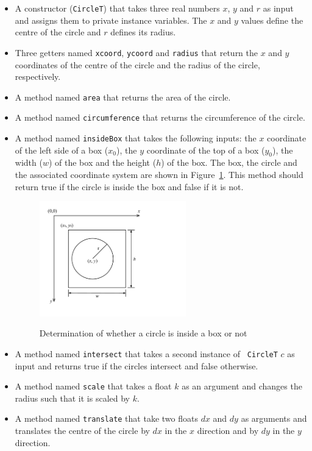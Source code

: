 \documentclass[12pt]{article}
\begin{document}
\begin{itemize}
\item A constructor ({\tt CircleT}) that takes three real numbers $x$, $y$
  and $r$ as input and assigns them to private instance variables.  The $x$ and
  $y$ values define the centre of the circle and $r$ defines its radius.

\item Three getters named {\tt xcoord}, {\tt ycoord} and {\tt radius} that
  return the $x$ and $y$ coordinates of the centre of the circle and the radius
  of the circle, respectively.

\item A method named {\tt area} that returns the area of the circle.

\item A method named {\tt circumference} that returns the circumference of the circle.

\item A method named {\tt insideBox} that takes the following inputs: 
  the $x$ coordinate of the left side of a box
  ($x_0$), the $y$ coordinate of the top of a box ($y_0$), the width ($w$) of
  the box and the height ($h$) of the box.  The box, the circle and the
  associated coordinate system are shown in Figure~\ref{Fig_CircleBoxIntersect}.
  This method should return true if the circle is inside the box and false if
  it is not.

\begin{figure}
\begin{center}
{
 \includegraphics[width=0.6\textwidth]{CircleBoxIntersect.pdf}
}
\caption{\label{Fig_CircleBoxIntersect} Determination of whether a circle is
  inside a box or not}
\end{center}
\end{figure}

\item A method named {\tt intersect} that takes a second instance of {\tt
    CircleT} $c$ as input and returns true if the circles intersect and false
  otherwise.

\item A method named {\tt scale} that takes a float $k$ as an argument 
  and changes the radius such that it is scaled by $k$.

\item A method named {\tt translate} that take two floats $dx$ and $dy$ as
  arguments and translates the centre of the circle by $dx$ in the $x$ direction
  and by $dy$ in the $y$ direction.

\end{itemize}
\end{document}
